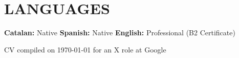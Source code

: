 \documentclass[letterpaper,11pt]{article}
\begin{document}
{%
\section{LANGUAGES}
    \textbf{Catalan:}{ Native}\hspace{22mm}
    \textbf{Spanish:}{ Native}\hspace{22mm}
    \textbf{English:}{ Professional (B2 Certificate)}

}
\vspace{5mm}

\scriptsize{CV compiled on {\today} for an X role at Google}


\end{document}
